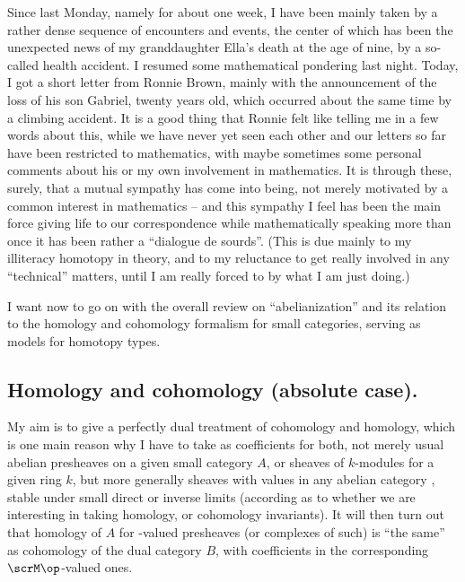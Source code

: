 \label{sec:108}%
Since last Monday, namely for about one week, I have been mainly taken
by a rather dense sequence of encounters and events, the center of
which has been the unexpected news of my granddaughter Ella's death at
the age of nine, by a so-called health accident. I resumed some
mathematical pondering last night. Today, I got a short letter from
Ronnie Brown, mainly with the announcement of the loss of his son
Gabriel, twenty years old, which occurred about the same time by a
climbing accident. It is a good thing that Ronnie felt like telling me
in a few words about this, while we have never yet seen each other and
our letters so far have been restricted to mathematics, with maybe
sometimes some personal comments about his or my own involvement in
mathematics. It is through these, surely, that a mutual sympathy has
come into being, not merely motivated by a common interest in
mathematics -- and this sympathy I feel has been the main force giving
life to our correspondence while mathematically speaking more than
once it has been rather a ``dialogue de
sourds''. (This is due mainly to
my illiteracy homotopy in theory, and to my reluctance to get really
involved in any ``technical'' matters, until I am really forced to by
what I am just doing.)

I want now to go on with the overall review on ``abelianization'' and
its relation to the homology and cohomology formalism for small
categories, serving as models for homotopy types.

\addtocounter{subsection}{6}
\subsection{Homology and cohomology (absolute case).}
\label{subsec:108.G}
My aim is to give a perfectly dual treatment of cohomology and
homology, which is one main reason why I have to take as coefficients
for both, not merely usual abelian presheaves on a given small
category $A$, or sheaves of $k$-modules for a given ring $k$, but more
generally sheaves with values in any abelian category \scrM, stable
under small direct or inverse limits (according as to whether we are
interesting in taking homology, or cohomology invariants). It will
then turn out that homology of $A$ for \scrM-valued presheaves (or
complexes of such) is ``the same'' as cohomology of the dual category
$B$, with coefficients in the corresponding $\scrM\op$-valued ones.

